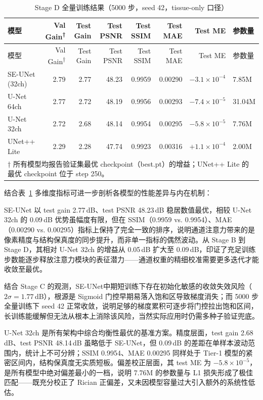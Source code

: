 \documentclass[UTF8,a4paper,12pt]{ctexart}
\begin{document}
{\footnotesize\setlength{\tabcolsep}{4pt}
  \begin{longtable}{l r r r r r r l}
    \caption{Stage D 全量训练结果（5000 步，seed 42，tissue-only 口径）\label{tab:full}}\\
    \toprule
    模型 & Val Gain\textsuperscript{†} & Test Gain & Test PSNR & Test SSIM & Test MAE & Test ME & 参数量 \\
    \midrule
    \endfirsthead
    \toprule
    模型 & Val Gain\textsuperscript{†} & Test Gain & Test PSNR & Test SSIM & Test MAE & Test ME & 参数量 \\
    \midrule
    \endhead
    \bottomrule
    \endfoot
    SE-UNet (32ch) & 2.79 & 2.77 & 48.23 & 0.9959 & 0.00290 & $-3.1\!\times\!10^{-4}$ & 7.85M \\
    U-Net 64ch & 2.77 & 2.72 & 48.19 & 0.9956 & 0.00293 & $-7.4\!\times\!10^{-5}$ & 31.04M \\
    U-Net 32ch & 2.72 & 2.68 & 48.14 & 0.9954 & 0.00295 & $-5.8\!\times\!10^{-5}$ & 7.76M \\
    UNet++ Lite & 2.29 & 2.28 & 47.74 & 0.9923 & 0.00316 & $+1.1\!\times\!10^{-4}$ & 2.00M \\
    \bottomrule
    \multicolumn{8}{l}{\footnotesize † 所有模型均报告验证集最优 checkpoint（best.pt）的增益；UNet++ Lite 的最优 checkpoint 位于 step 250。}
  \end{longtable}}

结合表~\ref{tab:full} 多维度指标可进一步剖析各模型的性能差异与内在机制：

SE-UNet 以 test gain 2.77\,dB、test PSNR 48.23\,dB 稳居数值最优，相较 U-Net 32ch 的 0.09\,dB 优势虽幅度有限，但在 SSIM（0.9959 vs. 0.9954）、MAE（0.00290 vs. 0.00295）指标上保持了完全一致的排序，说明通道注意力带来的是像素精度与结构保真度的同步提升，而非单一指标的偶然波动。从 Stage B 到 Stage D，其相对 U-Net 32ch 的增益从 0.05\,dB 扩大至 0.09\,dB，印证了充足训练步数能逐步释放注意力模块的表征潜力——通道权重的精细校准需要更多迭代才能收敛至最优。

结合 Stage C 的观测，SE-UNet中期短训练下存在初始化敏感的收敛失效风险（$2\sigma=1.77$\,dB），根源是 Sigmoid 门控早期易落入饱和区导致梯度消失；而 5000 步全量训练下 seed 42 正常收敛，说明足够的梯度累积可逐步将门控拉出饱和区间，长训练能缓解但无法从根本上消除该风险，当然实际应用时仍需多种子验证兜底。

U-Net 32ch 是所有架构中综合均衡性最优的基准方案。精度层面，test gain 2.68\,dB、test PSNR 48.14\,dB 虽略低于 SE-UNet，但 0.09\,dB 的差距在单样本波动范围内，统计上不可分辨；SSIM 0.9954、MAE 0.00295 同样处于 Tier-1 模型的紧密区间内，结构保真度无实质短板。偏差校正层面，其 test ME 为 $-5.8\times10^{-5}$，是所有模型中绝对偏差最小的一档，说明 7.76M 的参数量与 L1 损失形成了极佳匹配——既充分校正了 Rician 正偏差，又未因模型容量过大引入额外的系统性低估。
\end{document}
